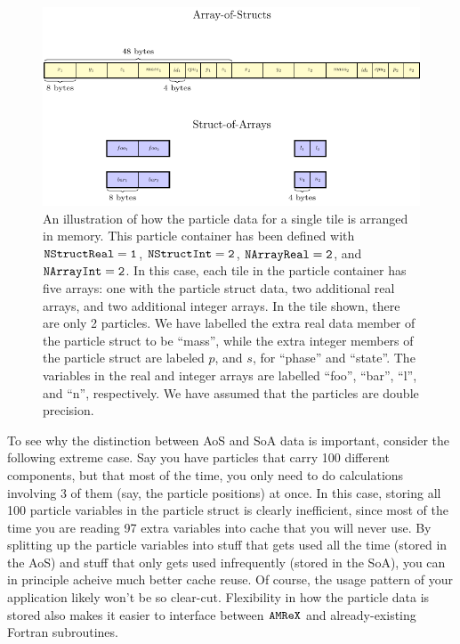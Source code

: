 \begin{figure}
  \centering
  \includegraphics[width=\textwidth]{./Particle/particle_arrays.pdf}
  \caption{\label{fig:particles:particle_arrays} An illustration of how the particle data for a single tile is arranged in memory. This particle container has been defined with $\tt{NStructReal} = 1$, $\tt{NStructInt} = 2$, $\tt{NArrayReal} = 2$, and $\tt{NArrayInt} = 2$. In this case, each tile in the particle container has five arrays: one with the particle struct data, two additional real arrays, and two additional integer arrays. In the tile shown, there are only 2 particles. We have labelled the extra real data member of the particle struct to be ``mass'', while the extra integer members of the particle struct are labeled $p$, and $s$, for ``phase'' and ``state''. The variables in the real and integer arrays are labelled ``foo'', ``bar'', ``l'', and ``n'', respectively. We have assumed that the particles are double precision.}
\end{figure}

To see why the distinction between AoS and SoA data is important, consider the following extreme case. Say you have particles that carry 100 different components,
but that most of the time, you only need to do calculations involving 3 of them (say, the particle positions) at once. In this case, storing all 100 particle variables in the particle
struct is clearly inefficient, since most of the time you are reading 97 extra variables into cache that you will never use. By splitting up the particle variables into stuff that gets 
used all the time (stored in the AoS) and stuff that only gets used infrequently (stored in the SoA), you can in principle acheive much better cache reuse. Of course, the usage pattern of your application likely won't be so clear-cut. Flexibility in how the particle data is stored also makes it easier to interface between $\tt{AMReX}$ and already-existing Fortran subroutines.

